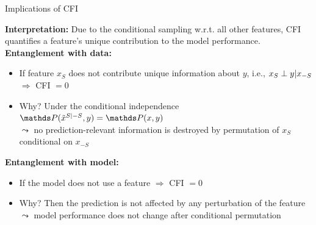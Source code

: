 \documentclass[11pt,compress,t,notes=noshow, aspectratio=169, xcolor=table]{beamer}
\begin{document}
\begin{frame}{Implications of CFI }

\textbf{Interpretation:} Due to the conditional sampling w.r.t. all other features, CFI quantifies a feature's unique contribution to the model performance.\\
\lz\pause
\textbf{Entanglement with data:}
\begin{itemize}
  \item If feature $x_S$ does not contribute unique information about $y$, i.e., $x_S \indep y | x_{-S}$ $\Rightarrow$ CFI $= 0$
  \item Why? Under the conditional independence $\P(\pert{x}{S}{-S}, y) = \P(x,y)$\\
  $\leadsto$ no prediction-relevant information is destroyed by permutation of $x_S$ conditional on $x_{-S}$
\end{itemize}
\lz\pause
\textbf{Entanglement with model:}
\begin{itemize}
  \item If the model does not use a feature $\Rightarrow$ CFI $= 0$
  \item Why? Then the prediction is not affected by any perturbation of the feature\\
  $\leadsto$ model performance does not change after conditional permutation
\end{itemize}

\end{frame}
\end{document}
